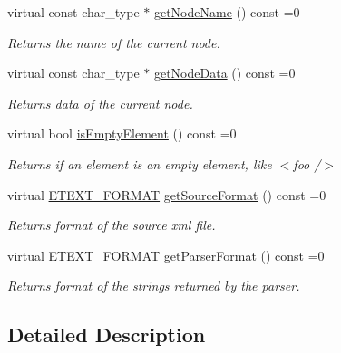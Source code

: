 \begin{DoxyCompactItemize}
virtual const char\+\_\+type $\ast$ \hyperlink{classirr_1_1io_1_1IIrrXMLReader_a7d745b130c895d0f910f191d04e20e87}{get\+Node\+Name} () const =0
\begin{DoxyCompactList}\small\item\em Returns the name of the current node. \end{DoxyCompactList}\item 
virtual const char\+\_\+type $\ast$ \hyperlink{classirr_1_1io_1_1IIrrXMLReader_aecbe0698e8f9acf88e27dd53da984210}{get\+Node\+Data} () const =0
\begin{DoxyCompactList}\small\item\em Returns data of the current node. \end{DoxyCompactList}\item 
\mbox{\label{classirr_1_1io_1_1IIrrXMLReader_a3c85b144e0376c9ff90bce1bbbc338a9}} 
virtual bool \hyperlink{classirr_1_1io_1_1IIrrXMLReader_a3c85b144e0376c9ff90bce1bbbc338a9}{is\+Empty\+Element} () const =0
\begin{DoxyCompactList}\small\item\em Returns if an element is an empty element, like $<$foo /$>$ \end{DoxyCompactList}\item 
virtual \hyperlink{namespaceirr_1_1io_ac7e51e5a6bd00451dec248f497b16a9d}{E\+T\+E\+X\+T\+\_\+\+F\+O\+R\+M\+AT} \hyperlink{classirr_1_1io_1_1IIrrXMLReader_a00998ef2d3a562d6b2b8302c3430322d}{get\+Source\+Format} () const =0
\begin{DoxyCompactList}\small\item\em Returns format of the source xml file. \end{DoxyCompactList}\item 
virtual \hyperlink{namespaceirr_1_1io_ac7e51e5a6bd00451dec248f497b16a9d}{E\+T\+E\+X\+T\+\_\+\+F\+O\+R\+M\+AT} \hyperlink{classirr_1_1io_1_1IIrrXMLReader_a9af7e323c292a4836bf4a7c093b4d85a}{get\+Parser\+Format} () const =0
\begin{DoxyCompactList}\small\item\em Returns format of the strings returned by the parser. \end{DoxyCompactList}\end{DoxyCompactItemize}


\subsection{Detailed Description}
